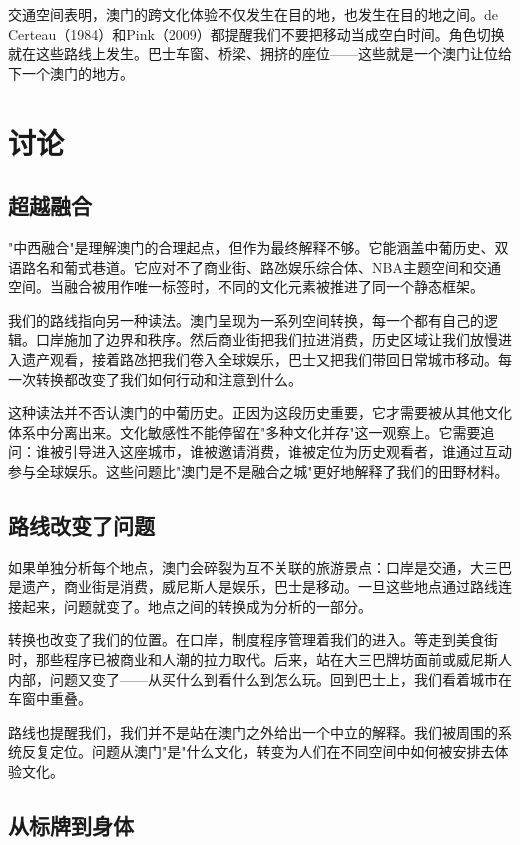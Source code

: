 \documentclass[12pt,a4paper]{article}
\begin{document}
交通空间表明，澳门的跨文化体验不仅发生在目的地，也发生在目的地之间。de Certeau（1984）和Pink（2009）都提醒我们不要把移动当成空白时间。角色切换就在这些路线上发生。巴士车窗、桥梁、拥挤的座位——这些就是一个澳门让位给下一个澳门的地方。

\section{讨论}

\subsection{超越融合}

"中西融合"是理解澳门的合理起点，但作为最终解释不够。它能涵盖中葡历史、双语路名和葡式巷道。它应对不了商业街、路氹娱乐综合体、NBA主题空间和交通空间。当融合被用作唯一标签时，不同的文化元素被推进了同一个静态框架。

我们的路线指向另一种读法。澳门呈现为一系列空间转换，每一个都有自己的逻辑。口岸施加了边界和秩序。然后商业街把我们拉进消费，历史区域让我们放慢进入遗产观看，接着路氹把我们卷入全球娱乐，巴士又把我们带回日常城市移动。每一次转换都改变了我们如何行动和注意到什么。

这种读法并不否认澳门的中葡历史。正因为这段历史重要，它才需要被从其他文化体系中分离出来。文化敏感性不能停留在"多种文化并存"这一观察上。它需要追问：谁被引导进入这座城市，谁被邀请消费，谁被定位为历史观看者，谁通过互动参与全球娱乐。这些问题比"澳门是不是融合之城"更好地解释了我们的田野材料。

\subsection{路线改变了问题}

如果单独分析每个地点，澳门会碎裂为互不关联的旅游景点：口岸是交通，大三巴是遗产，商业街是消费，威尼斯人是娱乐，巴士是移动。一旦这些地点通过路线连接起来，问题就变了。地点之间的转换成为分析的一部分。

转换也改变了我们的位置。在口岸，制度程序管理着我们的进入。等走到美食街时，那些程序已被商业和人潮的拉力取代。后来，站在大三巴牌坊面前或威尼斯人内部，问题又变了——从买什么到看什么到怎么玩。回到巴士上，我们看着城市在车窗中重叠。

路线也提醒我们，我们并不是站在澳门之外给出一个中立的解释。我们被周围的系统反复定位。问题从澳门"是"什么文化，转变为人们在不同空间中如何被安排去体验文化。

\subsection{从标牌到身体}
\end{document}
